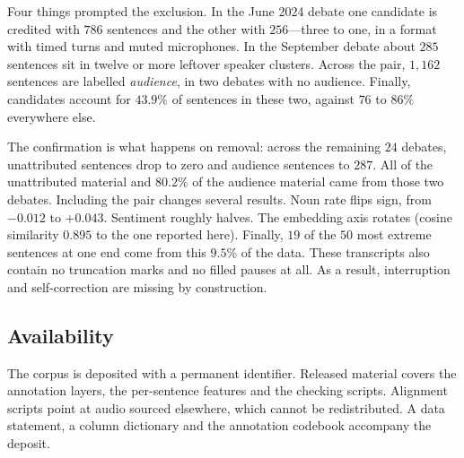\documentclass[pdflatex,sn-mathphys-num]{sn-jnl}%
\begin{document}
\begin{appendices}
Four things prompted the exclusion. In the June 2024 debate one candidate is
credited with $786$ sentences and the other with $256$---three to one, in a
format with timed turns and muted microphones. In the September debate about
$285$ sentences sit in twelve or more leftover speaker clusters. Across the
pair, $1{,}162$ sentences are labelled \emph{audience}, in two debates with no
audience. Finally, candidates account for $43.9\%$ of sentences in these
two, against $76$ to $86\%$ everywhere else.

The confirmation is what happens on removal: across the remaining $24$
debates, unattributed sentences drop to zero and audience sentences to $287$.
All of the unattributed material and $80.2\%$ of the audience material came
from those two debates. Including the pair changes several results. Noun
rate flips sign, from $-0.012$ to $+0.043$. Sentiment roughly halves. The
embedding axis rotates (cosine similarity $0.895$ to the one reported
here). Finally, $19$ of the $50$ most extreme sentences at one end come
from this $9.5\%$ of the data. These transcripts also contain no
truncation marks and no filled pauses at all. As a result, interruption
and self-correction are missing by construction.

\subsection*{Availability}
The corpus is deposited with a permanent identifier. Released material covers
the annotation layers, the per-sentence features and the checking scripts.
Alignment scripts point at audio sourced elsewhere, which cannot be
redistributed. A data statement, a column dictionary and the annotation
codebook accompany the deposit.
\label{app:resource}


\end{appendices}
\end{document}
